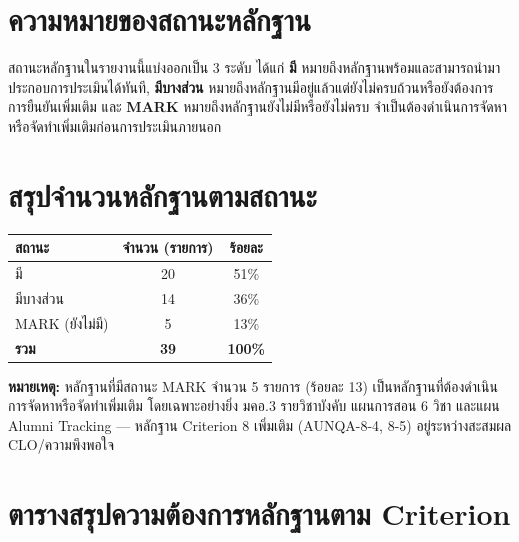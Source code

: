 \bigskip

\section{ความหมายของสถานะหลักฐาน}

สถานะหลักฐานในรายงานนี้แบ่งออกเป็น 3 ระดับ ได้แก่ \textbf{มี} หมายถึงหลักฐานพร้อมและสามารถนำมาประกอบการประเมินได้ทันที, \textbf{มีบางส่วน} หมายถึงหลักฐานมีอยู่แล้วแต่ยังไม่ครบถ้วนหรือยังต้องการการยืนยันเพิ่มเติม และ \textbf{MARK} หมายถึงหลักฐานยังไม่มีหรือยังไม่ครบ จำเป็นต้องดำเนินการจัดหาหรือจัดทำเพิ่มเติมก่อนการประเมินภายนอก

\section{สรุปจำนวนหลักฐานตามสถานะ}

\noindent\begin{tabularx}{\linewidth}{|>{\raggedright\arraybackslash}X|c|c|}
\hline
\textbf{สถานะ} & \textbf{จำนวน (รายการ)} & \textbf{ร้อยละ} \\
\hline
มี & 20 & 51\% \\
มีบางส่วน & 14 & 36\% \\
MARK (ยังไม่มี) & 5 & 13\% \\
\hline
\textbf{รวม} & \textbf{39} & \textbf{100\%} \\
\hline
\end{tabularx}

\bigskip

\textbf{หมายเหตุ:} หลักฐานที่มีสถานะ MARK จำนวน 5 รายการ (ร้อยละ 13) เป็นหลักฐานที่ต้องดำเนินการจัดหาหรือจัดทำเพิ่มเติม โดยเฉพาะอย่างยิ่ง มคอ.3 รายวิชาบังคับ แผนการสอน 6 วิชา และแผน Alumni Tracking — หลักฐาน Criterion 8 เพิ่มเติม (AUNQA-8-4, 8-5) อยู่ระหว่างสะสมผล CLO/ความพึงพอใจ

\bigskip

\section{ตารางสรุปความต้องการหลักฐานตาม Criterion}

